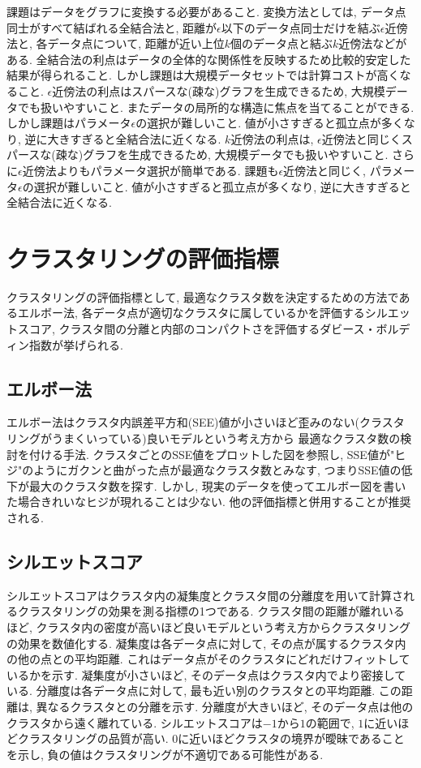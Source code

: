 \documentclass[dvipdfmx, 10pt]{jsarticle}
\begin{document}
課題はデータをグラフに変換する必要があること. 
変換方法としては, データ点同士がすべて結ばれる全結合法と, 距離が\(\epsilon\)以下のデータ点同士だけを結ぶ\(\epsilon\)近傍法と, 
各データ点について, 距離が近い上位\(k\)個のデータ点と結ぶ\(k\)近傍法などがある. 
全結合法の利点はデータの全体的な関係性を反映するため比較的安定した結果が得られること. 
しかし課題は大規模データセットでは計算コストが高くなること. 
\(\epsilon\)近傍法の利点はスパースな(疎な)グラフを生成できるため, 大規模データでも扱いやすいこと. 
またデータの局所的な構造に焦点を当てることができる. 
しかし課題はパラメータ\(\epsilon\)の選択が難しいこと. 値が小さすぎると孤立点が多くなり, 逆に大きすぎると全結合法に近くなる. 
\(k\)近傍法の利点は, \(\epsilon\)近傍法と同じくスパースな(疎な)グラフを生成できるため, 大規模データでも扱いやすいこと. 
さらに\(\epsilon\)近傍法よりもパラメータ選択が簡単である. 課題も\(\epsilon\)近傍法と同じく, 
パラメータ\(\epsilon\)の選択が難しいこと. 値が小さすぎると孤立点が多くなり, 逆に大きすぎると全結合法に近くなる. 

\section*{クラスタリングの評価指標}
クラスタリングの評価指標として, 最適なクラスタ数を決定するための方法であるエルボー法, 
各データ点が適切なクラスタに属しているかを評価するシルエットスコア, 
クラスタ間の分離と内部のコンパクトさを評価するダビース・ボルディン指数が挙げられる. 

\subsection*{エルボー法}
エルボー法はクラスタ内誤差平方和(SEE)値が小さいほど歪みのない(クラスタリングがうまくいっている)良いモデルという考え方から
最適なクラスタ数の検討を付ける手法. クラスタごとのSSE値をプロットした図を参照し, 
SSE値が"ヒジ"のようにガクンと曲がった点が最適なクラスタ数とみなす, つまりSSE値の低下が最大のクラスタ数を探す. 
しかし, 現実のデータを使ってエルボー図を書いた場合きれいなヒジが現れることは少ない. 他の評価指標と併用することが推奨される.

\subsection*{シルエットスコア}
シルエットスコアはクラスタ内の凝集度とクラスタ間の分離度を用いて計算されるクラスタリングの効果を測る指標の1つである. 
クラスタ間の距離が離れいるほど, クラスタ内の密度が高いほど良いモデルという考え方からクラスタリングの効果を数値化する. 
凝集度は各データ点に対して, その点が属するクラスタ内の他の点との平均距離. 
これはデータ点がそのクラスタにどれだけフィットしているかを示す. 
凝集度が小さいほど, そのデータ点はクラスタ内でより密接している.
分離度は各データ点に対して, 最も近い別のクラスタとの平均距離. 
この距離は, 異なるクラスタとの分離を示す. 分離度が大きいほど, そのデータ点は他のクラスタから遠く離れている. 
シルエットスコアは\(-1\)から\(1\)の範囲で, \(1\)に近いほどクラスタリングの品質が高い. 
\(0\)に近いほどクラスタの境界が曖昧であることを示し, 負の値はクラスタリングが不適切である可能性がある. 
\end{document}
